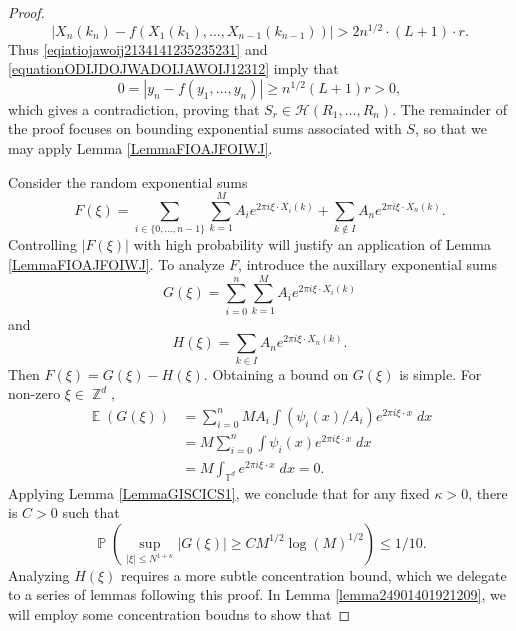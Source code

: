 \documentclass[dvipsnames,letterpaper,12pt]{article}
\numberwithin{equation}{section}
\DeclareMathOperator{\ZZ}{\mathbb{Z}}
\DeclareMathOperator{\TT}{\mathbb{T}}
\numberwithin{theorem}{section}
\DeclareMathOperator{\EE}{\mathbb{E}}
\DeclareMathOperator{\PP}{\mathbb{P}}
\begin{document}
\begin{proof}
    \begin{equation} \label{equationODIJDOJWADOIJAWOIJ12312}
        |X_n(k_n) - f(X_1(k_1),\dots,X_{n-1}(k_{n-1}))| > 2n^{1/2} \cdot (L+1) \cdot r.
    \end{equation}
    Thus \eqref{eqiatiojawoij2134141235235231} and \eqref{equationODIJDOJWADOIJAWOIJ12312} imply that
    \begin{equation}
        0 = |y_n - f(y_1,\dots,y_n)| \geq n^{1/2} (L+1) r > 0,
    \end{equation}
    which gives a contradiction, proving that $S_r \in \mathcal{H}(R_1,\dots,R_n)$. The remainder of the proof focuses on bounding exponential sums associated with $S$, so that we may apply Lemma \ref{LemmaFIOAJFOIWJ}.


    Consider the random exponential sums
    \[ F(\xi) = \sum_{i \in \{ 0, \dots, n-1 \}} \sum_{k = 1}^M A_i e^{2 \pi i \xi \cdot X_i(k)} + \sum_{k \not \in I} A_n e^{2 \pi i \xi \cdot X_n(k)}. \]
    Controlling $|F(\xi)|$ with high probability will justify an application of Lemma \ref{LemmaFIOAJFOIWJ}. To analyze $F$, introduce the auxillary exponential sums
    \[ G(\xi) = \sum_{i = 0}^n \sum_{k = 1}^M A_i e^{2 \pi i \xi \cdot X_i(k)} \]
    and
    \[ H(\xi) = \sum_{k \in I} A_n e^{2 \pi i \xi \cdot X_n(k)}. \]
    Then $F(\xi) = G(\xi) - H(\xi)$.
    Obtaining a bound on $G(\xi)$ is simple. For non-zero $\xi \in \ZZ^d$,
    \begin{equation}
    \begin{split}
        \EE(G(\xi)) &= \sum_{i = 0}^n M A_i \int (\psi_i(x) / A_i) e^{2 \pi i \xi \cdot x}\; dx\\
        &= M \sum_{i = 0}^n \int \psi_i(x) e^{2 \pi i \xi \cdot x}\; dx\\
        &= M \int_{\TT^d} e^{2 \pi i \xi \cdot x}\; dx = 0.
    \end{split}
    \end{equation}
    Applying Lemma \ref{LemmaGISCICS1}, we conclude that for any fixed $\kappa > 0$, there is $C > 0$ such that
    \begin{equation} \label{equationCOIACOIAJCPPPPP}
        \PP \left( \sup_{|\xi| \leq N^{1 + \kappa}} |G(\xi)| \geq C M^{1/2} \log(M)^{1/2} \right) \leq 1/10.
    \end{equation}
    Analyzing $H(\xi)$ requires a more subtle concentration bound, which we delegate to a series of lemmas following this proof. In Lemma \ref{lemma24901401921209}, we will employ some concentration boudns to show that

\end{proof}
\end{document}
